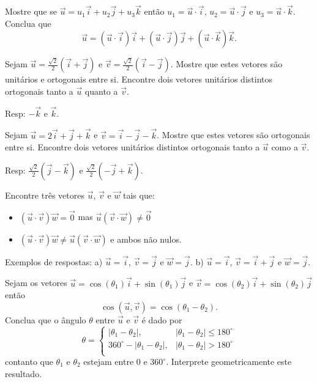 \begin{exer}Mostre que se $\vec{u}=u_1\vec{i}+u_2\vec{j}+u_3\vec{k}$ então $u_1=\vec{u}\cdot\vec{i}$, $u_2=\vec{u}\cdot\vec{j}$ e $u_3=\vec{u}\cdot\vec{k}$. Conclua que
$$\vec{u}=\left(\vec{u}\cdot\vec{i}\right) \vec{i}+\left(\vec{u}\cdot\vec{j}\right) \vec{j}+\left(\vec{u}\cdot\vec{k}\right) \vec{k}.$$

\end{exer}

\begin{exer}\label{exort1}Sejam $\vec{u}=\frac{\sqrt{2}}{2}\left(\vec{i}+\vec{j}\right)$ e $\vec{v}=\frac{\sqrt{2}}{2}\left(\vec{i}-\vec{j}\right)$. Mostre que estes vetores são unitários e ortogonais entre si. Encontre dois vetores unitários distintos ortogonais tanto a $\vec{u}$ quanto a $\vec{v}$.
\end{exer}
Resp: $-\vec{k}$ e $\vec{k}$.

\begin{exer}\label{exort2} Sejam $\vec{u}=2\vec{i}+\vec{j}+\vec{k}$ e $\vec{v}=\vec{i}-\vec{j}-\vec{k}$. Mostre que estes vetores são ortogonais entre si. Encontre dois vetores unitários distintos ortogonais tanto a  $\vec{u}$ como a $\vec{v}$.
\end{exer}
Resp: $\frac{\sqrt{2}}{2}\left(\vec{j}-\vec{k}\right)$ e $\frac{\sqrt{2}}{2}\left(-\vec{j}+\vec{k}\right)$.

\begin{exer} Encontre três vetores $\vec{u}$, $\vec{v}$ e $\vec{w}$ tais que:
\begin{itemize}
\item [a)] $\left(\vec{u}\cdot\vec{v}\right)\vec{w}=\vec{0}$ mas $\vec{u}\left(\vec{v}\cdot\vec{w}\right)\neq \vec{0}$
\item [b)] $\left(\vec{u}\cdot\vec{v}\right)\vec{w}\neq \vec{u}\left(\vec{v}\cdot\vec{w}\right)$ e ambos não nulos.
\end{itemize}
\end{exer}

Exemplos de respostas: a) $\vec{u}=\vec{i}$, $\vec{v}=\vec{j}$ e $\vec{w}=\vec{j}$. b) $\vec{u}=\vec{i}$, $\vec{v}=\vec{i}+\vec{j}$ e $\vec{w}=\vec{j}$.

\begin{exer} Sejam os vetores $\vec{u}=\cos(\theta_1)\vec{i}+\sin(\theta_1)\vec{j}$ e $\vec{v}=\cos(\theta_2)\vec{i}+\sin(\theta_2)\vec{j}$ então
$$\cos\left(\vec{u},\vec{v}\right)=\cos(\theta_1-\theta_2).$$
Conclua que o ângulo $\theta$ entre $\vec{u}$ e $\vec{v}$ é dado por
$$\theta=\left\{
\begin{array}{ll}
|\theta_1-\theta_2|,& |\theta_1-\theta_2|\leq 180^\circ\\
360^\circ-|\theta_1-\theta_2|,& |\theta_1-\theta_2|> 180^\circ\\
\end{array}
\right.$$
contanto que $\theta_1$ e $\theta_2$ estejam entre $0$ e $360^\circ$.
Interprete geometricamente este resultado.
\end{exer}

